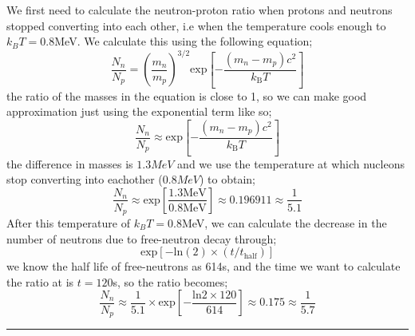 \documentclass[11pt, a4paper, answers]{exam}
\begin{document}
\begin{questions}
    \begin{solution}
        We first need to calculate the neutron-proton ratio when protons and neutrons stopped
        converting into each other, i.e when the temperature cools enough to $ k_BT = 0.8$MeV. We
        calculate this using the following equation;
        \begin{equation*}
            \frac{N_n}{N_p} = \left( \frac{m_n}{m_p}\right)^{3/2}\text{exp}\left[
                -\frac{(m_n-m_p)c^2}{k_{\text{B}}T}
                \right]
        \end{equation*}
        the ratio of the masses in the equation is close to 1, so we can make good approximation
        just using the exponential term like so;
        \begin{equation*}
            \frac{N_n}{N_p} \approx\text{exp}\left[
                -\frac{(m_n-m_p)c^2}{k_{\text{B}}T}
                \right]
        \end{equation*}
        the difference in masses is $1.3MeV$ and we use the temperature at which nucleons stop
        converting into eachother ($0.8MeV$) to obtain;
        \begin{equation*}
            \frac{N_n}{N_p} \approx \text{exp}\left[
                \frac{1.3 \text{MeV}}{0.8 \text{MeV}}
                \right] \approx 0.196911 \approx \frac{1}{5.1}
        \end{equation*}
        After this temperature of $ k_BT = 0.8$MeV, we can calculate the decrease in the number of
        neutrons due to free-neutron decay through;
        \begin{equation*}
            \text{exp}\left[-\text{ln}(2)\times (t/t_{\text{half}})\right]
        \end{equation*}
        we know the half life of free-neutrons as 614s, and the time we want to calculate the ratio
        at is $t = 120$s, so the ratio becomes;
        \begin{equation*}
            \frac{N_n}{N_p} \approx \frac{1}{5.1} \times \text{exp}\left[
                -\frac{\text{ln}2 \times 120}{614}
                \right] \approx 0.175 \approx \frac{1}{5.7}
        \end{equation*}

    \end{solution}


    \begin{center}
        \rule{8cm}{0.4pt}
    \end{center}
    \newpage



\end{questions}
\end{document}
